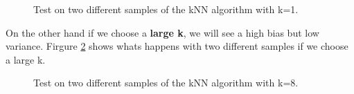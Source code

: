 \begin{figure}[H] %
\centerline{
\quad
{} 
}
\caption{\label{fig:knn_k1} 
Test on two different samples of the kNN algorithm with k=1.
}
\end{figure}

On the other hand if we choose a {\bf large k}, we will see a high bias but low variance. Firgure \ref{fig:knn_k8} shows whats happens with two different samples if we choose a large k.

\begin{figure}[H] %
\centerline{
\quad
{} 
}
\caption{\label{fig:knn_k8} 
Test on two different samples of the kNN algorithm with k=8.
}
\end{figure}

